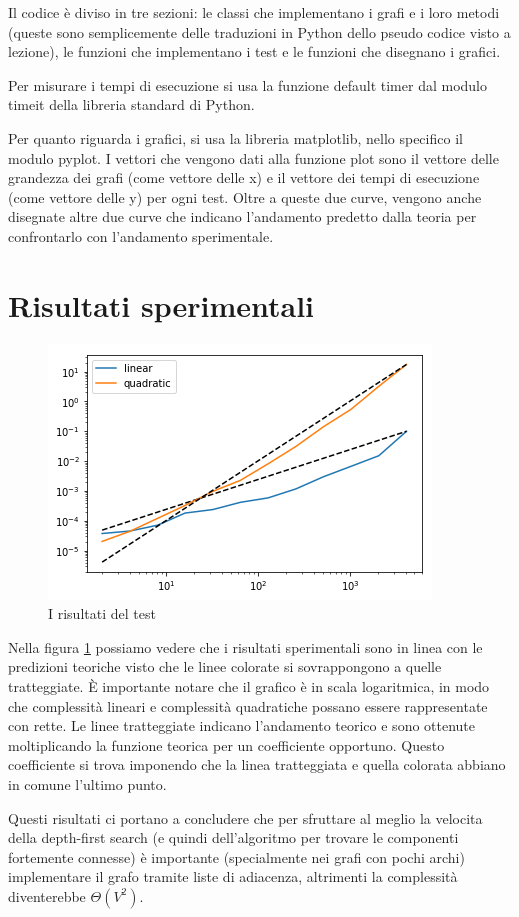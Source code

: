 \documentclass{article}
\begin{document}
Il codice è diviso in tre sezioni: le classi che implementano i grafi e i loro metodi (queste sono semplicemente delle traduzioni in Python dello pseudo codice visto a lezione), le funzioni che implementano i test e le funzioni che disegnano i grafici.

Per misurare i tempi di esecuzione si usa la funzione default timer dal modulo timeit della libreria standard di Python.

Per quanto riguarda i grafici, si usa la libreria matplotlib, nello specifico il modulo pyplot. I vettori che vengono dati alla funzione plot sono il vettore delle grandezza dei grafi (come vettore delle x) e il vettore dei tempi di esecuzione (come vettore delle y) per ogni test. Oltre a queste due curve, vengono anche disegnate altre due curve che indicano l'andamento predetto dalla teoria per confrontarlo con l'andamento sperimentale.

\section{Risultati sperimentali}

\begin{figure}[h]
    \centering
    \includegraphics{grafico}
    \caption{I risultati del test}
    \label{fig:grafico}
\end{figure}

Nella figura \ref{fig:grafico} possiamo vedere che i risultati sperimentali sono in linea con le predizioni teoriche visto che le linee colorate si sovrappongono a quelle tratteggiate. È importante notare che il grafico è in scala logaritmica, in modo che complessità lineari e complessità quadratiche possano essere rappresentate con rette. Le linee tratteggiate indicano l'andamento teorico e sono ottenute moltiplicando la funzione teorica per un coefficiente opportuno. Questo coefficiente si trova imponendo che la linea tratteggiata e quella colorata abbiano in comune l'ultimo punto.

Questi risultati ci portano a concludere che per sfruttare al meglio la velocita della depth-first search (e quindi dell'algoritmo per trovare le componenti fortemente connesse) è importante (specialmente nei grafi con pochi archi) implementare il grafo tramite liste di adiacenza, altrimenti la complessità diventerebbe $\Theta(V^2)$.
\end{document}
